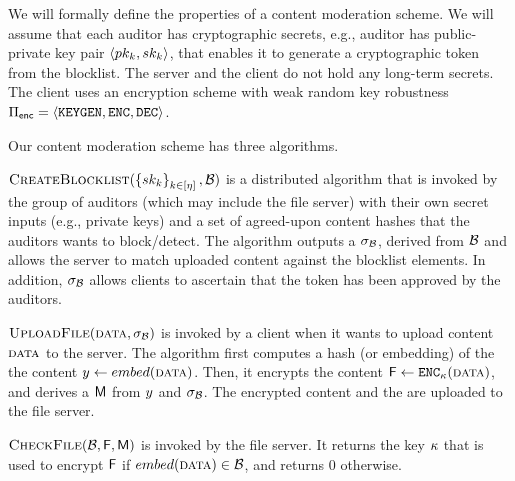 %

\iffalse 
We will formally define the properties of a content moderation scheme. 
We will assume that each auditor has cryptographic secrets, e.g., auditor \auditorIdx has public-private 
key pair  $\tupleDefn{\pubKey[\auditorIdx], 
\privKey[\auditorIdx]}$, that enables it to generate a cryptographic token 
from the blocklist. The server and the client do not hold any long-term secrets. 
The client uses an encryption scheme with weak random key robustness 
$\encryptionSchemeDefn$.

Our content moderation scheme has three algorithms.

\enumListStart
	\item \underline{$\createBlocklist(\setOfAuditorPrivkeys, \blocklist)$} 
	 is a distributed algorithm that is invoked by the group of \numAuditors auditors (which may  
	 include the file server) with their own secret inputs (e.g., private keys) and a set of agreed-upon 
	 content hashes \blocklist that the auditors wants to block/detect.
        The algorithm outputs a \blklistToken $\genericSig[\blocklist]$, derived from $\blocklist$ 
        and allows the server to match uploaded content against the blocklist elements. In addition,  
	$\genericSig[\blocklist]$ allows clients to ascertain that the token has been approved by the auditors. 

	\item \underline{$\uploadFile(\clientData, \genericSig[\blocklist])$} is invoked by a client when it 
	wants to upload content $\clientData$ to the server. The algorithm first computes a hash (or embedding) of the the content 
	$\genericCInputElmt \assign \contentHash(\clientData)$. 
	Then, it encrypts the content $\cOutputFile \assign 
	\encrypt[\genericSymmKey](\clientData)$,
	and derives a \contentToken $\cOutputMeta$ from $\genericCInputElmt$ and $\genericSig[\blocklist]$. The encrypted content and the \contentToken are uploaded to the file server. 
	
	\item \underline{$\checkContent(\blocklist,\cOutputFile, \cOutputMeta)$}
          is invoked by the file server.  It returns the key
          $\kappa$ that is used to encrypt $\cOutputFile$
          if $\contentHash(\clientData) \in \blocklist$, and returns 0 otherwise.
\enumListEnd


